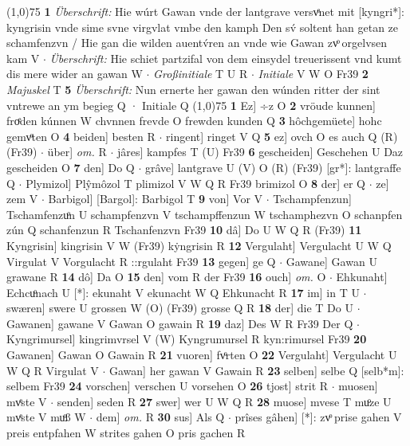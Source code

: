 \documentclass[8pt,a4paper,notitlepage]{article}
\begin{document}
\begin{table}[ht]
\begin{minipage}[t]{0.5\linewidth}
\line(1,0){75} \newline
\textbf{1} \textit{Überschrift:} Hie wúrt Gawan vnde der lantgrave versvͤnet mit [kyngri*]: kyngrisin vnde sime svne virgvlat vmbe den kamph Den sv́ soltent han getan ze schamfenzvn / Hie gan die wilden auentv́ren an vnde wie Gawan zvͦ orgelvsen kam V   $\cdot$ \textit{Überschrift:} Hie schiet partzifal von dem einsydel treuerissent vnd kumt dis mere wider an gawan W   $\cdot$ \textit{Großinitiale} T U R   $\cdot$ \textit{Initiale} V W O Fr39  \textbf{2} \textit{Majuskel} T  \textbf{5} \textit{Überschrift:} Nun ernerte her gawan den wúnden ritter der sint vntrewe an ym begieg Q  · Initiale Q  \newline
\line(1,0){75} \newline
\textbf{1} Ez] ÷z O \textbf{2} vröude kunnen] froͤden kúnnen W chvnnen frevde O frewden kunden Q \textbf{3} hôchgemüete] hohc gemvͦten O \textbf{4} beiden] besten R  $\cdot$ ringent] ringet V Q \textbf{5} ez] ovch O es auch Q (R) (Fr39)  $\cdot$ über] \textit{om.} R  $\cdot$ jâres] kampfes T (U) Fr39 \textbf{6} gescheiden] Geschehen U Daz gescheiden O \textbf{7} den] Do Q  $\cdot$ grâve] lantgrave U (V) O (R) (Fr39) [gr*]: lantgraffe  Q  $\cdot$ Plymizol] Plŷmôzol T plimizol V W Q R Fr39 brimizol O \textbf{8} der] er Q  $\cdot$ ze] zem V  $\cdot$ Barbigol] [Bargol]: Barbigol T \textbf{9} von] Vor V  $\cdot$ Tschampfenzun] Tschamfenzuͦn U schampfenzvn V tschampffenzun W tschamphezvn O schanpfen zún Q schanfenzun R Tschanfenzvn Fr39 \textbf{10} dâ] Do U W Q R (Fr39) \textbf{11} Kyngrisin] kingrisin V W (Fr39) kẏngrisin R \textbf{12} Vergulaht] Vergulacht U W Q Virgulat V Vorgulacht R ::rgulaht Fr39 \textbf{13} gegen] ge Q  $\cdot$ Gawane] Gawan U grawane R \textbf{14} dô] Da O \textbf{15} den] vom R der Fr39 \textbf{16} ouch] \textit{om.} O  $\cdot$ Ehkunaht] Echcuͦnach U [*]: ekunaht V ekunacht W Q Ehkunacht R \textbf{17} im] in T U  $\cdot$ swæren] swere U grossen W (O) (Fr39) grosse Q R \textbf{18} der] die T Do U  $\cdot$ Gawanen] gawane V Gawan O gawain R \textbf{19} daz] Des W R Fr39 Der Q  $\cdot$ Kyngrimursel] kingrimvrsel V (W) Kyngrumursel R kyn:rimursel Fr39 \textbf{20} Gawanen] Gawan O Gawain R \textbf{21} vuoren] fvͦrten O \textbf{22} Vergulaht] Vergulacht U W Q R Virgulat V  $\cdot$ Gawan] her gawan V Gawain R \textbf{23} selben] selbe Q [selb*m]: selbem Fr39 \textbf{24} vorschen] verschen U vorsehen O \textbf{26} tjost] strit R  $\cdot$ muosen] mvͤste V  $\cdot$ senden] seden R \textbf{27} swer] wer U W Q R \textbf{28} muose] mvese T muͦze U mvͤste V muͦß W  $\cdot$ dem] \textit{om.} R \textbf{30} sus] Als Q  $\cdot$ prîses gâhen] [*]: zvͦ prise gahen V preis entpfahen W strites gahen O pris gachen R \newline
\end{minipage}
\end{table}
\end{document}

